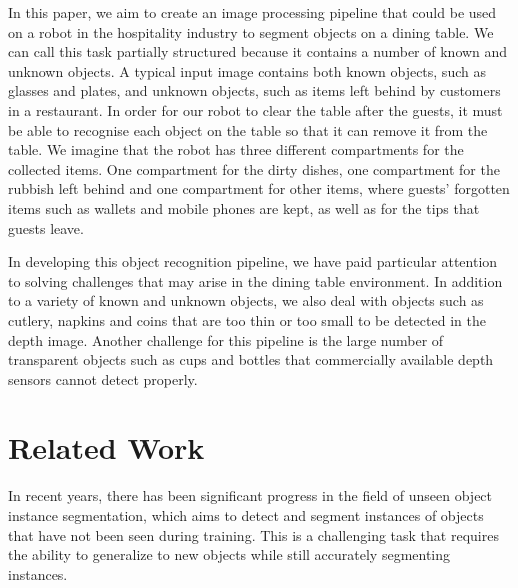 \documentclass[10pt,twocolumn,letterpaper]{article}
\begin{document}
In this paper, we aim to create an image processing pipeline that could be used on a robot in the hospitality industry to segment objects on a dining table. We can call this task partially structured because it contains a number of known and unknown objects. A typical input image contains both known objects, such as glasses and plates, and unknown objects, such as items left behind by customers in a restaurant. In order for our robot to clear the table after the guests, it must be able to recognise each object on the table so that it can remove it from the table. We imagine that the robot has three different compartments for the collected items. One compartment for the dirty dishes, one compartment for the rubbish left behind and one compartment for other items, where guests' forgotten items such as wallets and mobile phones are kept, as well as for the tips that guests leave.

In developing this object recognition pipeline, we have paid particular attention to solving challenges that may arise in the dining table environment. In addition to a variety of known and unknown objects, we also deal with objects such as cutlery, napkins and coins that are too thin or too small to be detected in the depth image. Another challenge for this pipeline is the large number of transparent objects such as cups and bottles that commercially available depth sensors cannot detect properly.


\section{Related Work}

In recent years, there has been significant progress in the field of unseen object instance segmentation, which aims to detect and segment instances of objects that have not been seen during training. This is a challenging task that requires the ability to generalize to new objects while still accurately segmenting instances.
\end{document}
